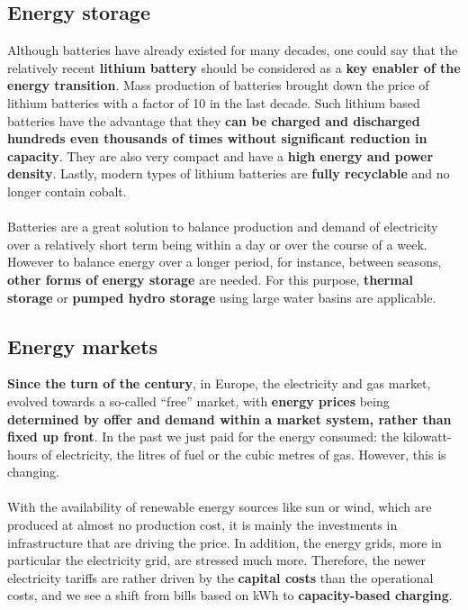 \documentclass[../summary.tex]{subfiles}
\begin{document}
	\subsection{Energy storage}
	
	Although batteries have already existed for many decades, one could say that the relatively recent \textbf{lithium battery} should be considered as a \textbf{key enabler of the energy transition}. Mass production of batteries brought down the price of lithium batteries with a factor of 10 in the last decade. Such lithium based batteries have the advantage that they \textbf{can be charged and discharged hundreds even thousands of times without significant reduction in capacity}. They are also very compact and have a \textbf{high energy and power density}. Lastly, modern types of lithium batteries are \textbf{fully recyclable} and no longer contain cobalt.
	\\\\
	Batteries are a great solution to balance production and demand of electricity over a relatively short term being within a day or over the course of a week. However to balance energy over a longer period, for instance, between seasons, \textbf{other forms of energy storage} are needed. For this purpose, \textbf{thermal storage} or \textbf{pumped hydro storage} using large water basins are applicable. 
	
	\subsection{Energy markets}
	
	\textbf{ Since the turn of the century}, in Europe, the electricity and gas market, evolved towards a so-called “free” market, with \textbf{energy prices} being\textbf{ determined by offer and demand within a market system, rather than fixed up front}. In the past we just paid for the energy consumed: the kilowatt-hours of electricity, the litres of fuel or the cubic metres of gas. However, this is changing.
	\\\\
	With the availability of renewable energy sources like sun or wind, which are produced at almost no production cost, it is mainly the investments in infrastructure that are driving the price. In addition, the energy grids, more in particular the electricity grid, are stressed much more. Therefore, the newer electricity tariffs are rather driven by the \textbf{capital costs} than the operational costs, and we see a shift from bills based on \unit{\kWh} to \textbf{capacity-based charging}.
	
\end{document}
